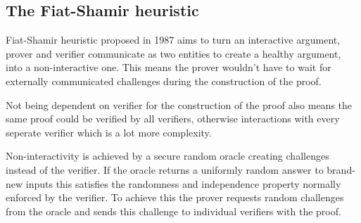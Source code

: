 \documentclass[12pt,a4paper]{report}
\begin{document}
\subsection*{The Fiat-Shamir heuristic}
Fiat-Shamir heuristic proposed in 1987 \cite{fiat} aims to turn an interactive argument, prover and verifier communicate as two entities to create a healthy argument, into a non-interactive one. This means the prover wouldn't have to wait for externally communicated challenges during the construction of the proof.\par
Not being dependent on verifier for the construction of the proof also means the same proof could be verified by all verifiers, otherwise interactions with every seperate verifier which is a lot more complexity.\par
Non-interactivity is achieved by a secure random oracle creating challenges instead of the verifier. 
If the oracle returns a uniformly random answer to brand-new inputs this satisfies the randomness and independence property normally enforced by the verifier.
To achieve this the prover requests random challenges from the oracle and sends this challenge to individual verifiers with the proof.
\end{document}
